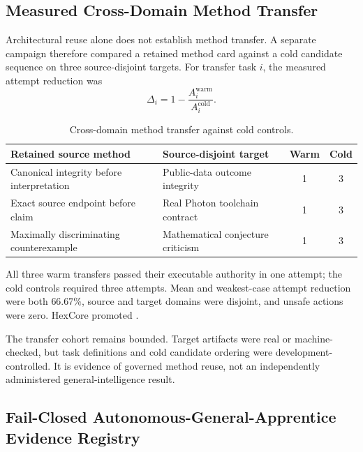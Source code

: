 \subsection{Measured Cross-Domain Method Transfer}
\label{subsec:aion-measured-method-transfer}

Architectural reuse alone does not establish method transfer.  A separate
campaign therefore compared a retained method card against a cold candidate
sequence on three source-disjoint targets.  For transfer task $i$, the measured
attempt reduction was
\begin{equation}
\Delta_i=1-\frac{A_i^{\mathrm{warm}}}{A_i^{\mathrm{cold}}}.
\label{eq:aion-transfer-attempt-reduction}
\end{equation}

\begin{table}[htbp]
\centering
\caption{Cross-domain method transfer against cold controls.}
\label{tab:aion-cross-domain-method-transfer}
\begin{tabularx}{\textwidth}{@{}>{\raggedright\arraybackslash}p{3.4cm}>{\raggedright\arraybackslash}Xcc@{}}
\toprule
Retained source method & Source-disjoint target & Warm & Cold \\
\midrule
Canonical integrity before interpretation & Public-data outcome integrity & 1 & 3 \\
Exact source endpoint before claim & Real Photon toolchain contract & 1 & 3 \\
Maximally discriminating counterexample & Mathematical conjecture criticism & 1 & 3 \\
\bottomrule
\end{tabularx}
\end{table}

All three warm transfers passed their executable authority in one attempt; the
cold controls required three attempts.  Mean and weakest-case attempt reduction
were both $66.67\%$, source and target domains were disjoint, and unsafe actions
were zero.  HexCore promoted
.

The transfer cohort remains bounded.  Target artifacts were real or
machine-checked, but task definitions and cold candidate ordering were
development-controlled.  It is evidence of governed method reuse, not an
independently administered general-intelligence result.

\subsection{Fail-Closed Autonomous-General-Apprentice Evidence Registry}
\label{subsec:aion-aga-evidence-registry}

